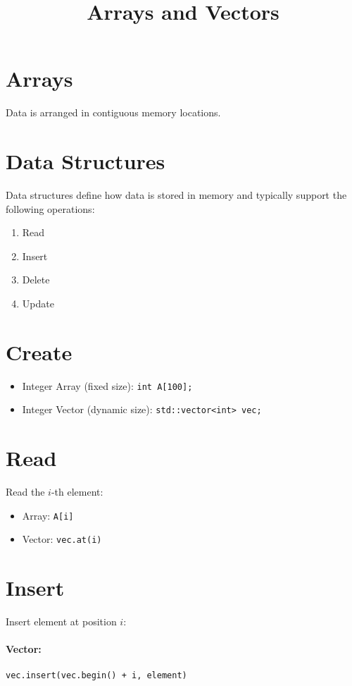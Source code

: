 \documentclass{article}
\title{Arrays and Vectors}
\author{}
\date{}
\begin{document}
\maketitle



\section{Arrays}
Data is arranged in contiguous memory locations.

\section{Data Structures}
Data structures define how data is stored in memory and typically support the following operations:

\begin{enumerate}
    \item Read
    \item Insert
    \item Delete
    \item Update
\end{enumerate}

\section{Create}

\begin{itemize}
    \item Integer Array (fixed size): \verb|int A[100];|
    \item Integer Vector (dynamic size): \verb|std::vector<int> vec;|
\end{itemize}

\section{Read}
Read the $i$-th element:
\begin{itemize}
    \item Array: \verb|A[i]|
    \item Vector: \verb|vec.at(i)|
\end{itemize}

\section{Insert}
Insert element at position $i$:

\paragraph{Vector:}
\begin{verbatim}
vec.insert(vec.begin() + i, element)
\end{verbatim}
\end{document}

